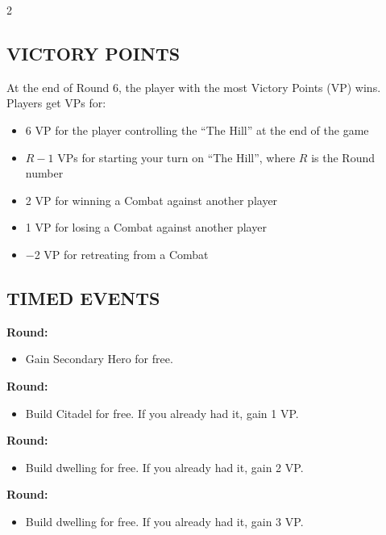\begin{multicols}{2}
\subsection*{\MakeUppercase{Victory Points}}
At the end of Round 6, the player with the most Victory Points (VP) wins.
Players get VPs for:
\begin{itemize}
  \item 6 VP for the player controlling the ``The Hill'' at the end of the game
  \item $R-1$ VPs for starting your turn on ``The Hill'', where $R$ is the Round number
  \item 2 VP for winning a Combat against another player
  \item 1 VP for losing a Combat against another player
  \item $-$2 VP for retreating from a Combat
\end{itemize}

\subsection*{\MakeUppercase{Timed Events}}

\textbf{ Round:}
\begin{itemize}
  \item Gain Secondary Hero for free.
\end{itemize}
\textbf{ Round:}
\begin{itemize}
  \item Build Citadel for free. If you already had it, gain 1 VP.
\end{itemize}
\textbf{ Round:}
\begin{itemize}
  \item Build  dwelling for free. If you already had it, gain 2 VP.
\end{itemize}
\textbf{ Round:}
\begin{itemize}
  \item Build  dwelling for free. If you already had it, gain 3 VP.
\end{itemize}


\end{multicols}
